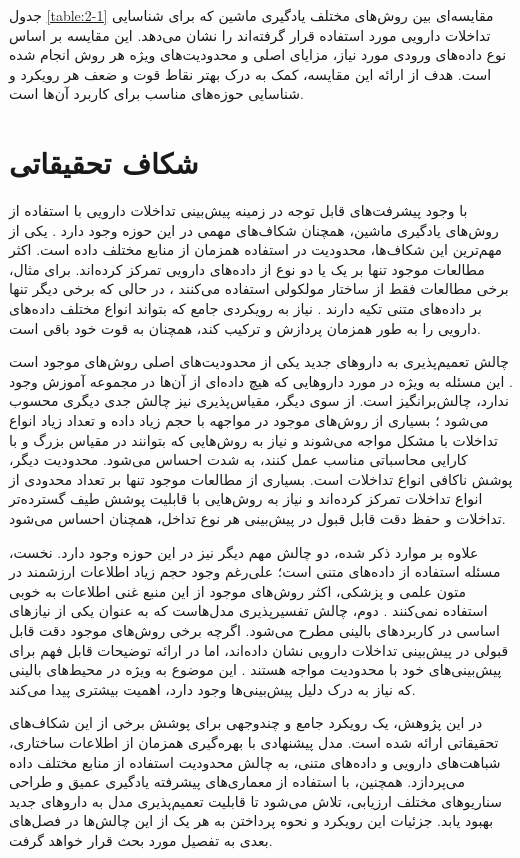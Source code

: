 \begin{table}[t]
\end{table}

جدول \ref{table:2-1} مقایسه‌ای بین روش‌های مختلف یادگیری ماشین که برای شناسایی تداخلات دارویی مورد استفاده قرار گرفته‌اند را نشان می‌دهد. این مقایسه بر اساس نوع داده‌های ورودی مورد نیاز، مزایای اصلی و محدودیت‌های ویژه هر روش انجام شده است. هدف از ارائه این مقایسه، کمک به درک بهتر نقاط قوت و ضعف هر رویکرد و شناسایی حوزه‌های مناسب برای کاربرد آن‌ها است.


\section{شکاف تحقیقاتی}

با وجود پیشرفت‌های قابل توجه در زمینه پیش‌بینی تداخلات دارویی با استفاده از روش‌های یادگیری ماشین، همچنان شکاف‌های مهمی در این حوزه وجود دارد \cite{ref_shi2024}. یکی از مهم‌ترین این شکاف‌ها، محدودیت در استفاده همزمان از منابع مختلف داده است. اکثر مطالعات موجود تنها بر یک یا دو نوع از داده‌های دارویی تمرکز کرده‌اند. برای مثال، برخی مطالعات فقط از ساختار مولکولی استفاده می‌کنند \cite{ref_nyamabo2021}، در حالی که برخی دیگر تنها بر داده‌های متنی تکیه دارند \cite{ref_he2023}. نیاز به رویکردی جامع که بتواند انواع مختلف داده‌های دارویی را به طور همزمان پردازش و ترکیب کند، همچنان به قوت خود باقی است.

چالش تعمیم‌پذیری به داروهای جدید یکی از محدودیت‌های اصلی روش‌های موجود است \cite{ref_deng2020}. این مسئله به ویژه در مورد داروهایی که هیچ داده‌ای از آن‌ها در مجموعه آموزش وجود ندارد، چالش‌برانگیز است. از سوی دیگر، مقیاس‌پذیری نیز چالش جدی دیگری محسوب می‌شود \cite{ref_dai2020}؛ بسیاری از روش‌های موجود در مواجهه با حجم زیاد داده و تعداد زیاد انواع تداخلات با مشکل مواجه می‌شوند و نیاز به روش‌هایی که بتوانند در مقیاس بزرگ و با کارایی محاسباتی مناسب عمل کنند، به شدت احساس می‌شود. محدودیت دیگر، پوشش ناکافی انواع تداخلات است. بسیاری از مطالعات موجود تنها بر تعداد محدودی از انواع تداخلات تمرکز کرده‌اند \cite{ref_ryu2018} و نیاز به روش‌هایی با قابلیت پوشش طیف گسترده‌تر تداخلات و حفظ دقت قابل قبول در پیش‌بینی هر نوع تداخل، همچنان احساس می‌شود.

علاوه بر موارد ذکر شده، دو چالش مهم دیگر نیز در این حوزه وجود دارد. نخست، مسئله استفاده از داده‌های متنی است؛ علی‌رغم وجود حجم زیاد اطلاعات ارزشمند در متون علمی و پزشکی، اکثر روش‌های موجود از این منبع غنی اطلاعات به خوبی استفاده نمی‌کنند \cite{ref_he2023}. دوم، چالش تفسیرپذیری مدل‌هاست که به عنوان یکی از نیازهای اساسی در کاربردهای بالینی مطرح می‌شود. اگرچه برخی روش‌های موجود دقت قابل قبولی در پیش‌بینی تداخلات دارویی نشان داده‌اند، اما در ارائه توضیحات قابل فهم برای پیش‌بینی‌های خود با محدودیت مواجه هستند \cite{ref_lin2022}. این موضوع به ویژه در محیط‌های بالینی که نیاز به درک دلیل پیش‌بینی‌ها وجود دارد، اهمیت بیشتری پیدا می‌کند.

در این پژوهش، یک رویکرد جامع و چندوجهی برای پوشش برخی از این شکاف‌های تحقیقاتی ارائه شده است. مدل پیشنهادی با بهره‌گیری همزمان از اطلاعات ساختاری، شباهت‌های دارویی و داده‌های متنی، به چالش محدودیت استفاده از منابع مختلف داده می‌پردازد. همچنین، با استفاده از معماری‌های پیشرفته یادگیری عمیق و طراحی سناریوهای مختلف ارزیابی، تلاش می‌شود تا قابلیت تعمیم‌پذیری مدل به داروهای جدید بهبود یابد. جزئیات این رویکرد و نحوه پرداختن به هر یک از این چالش‌ها در فصل‌های بعدی به تفصیل مورد بحث قرار خواهد گرفت.

